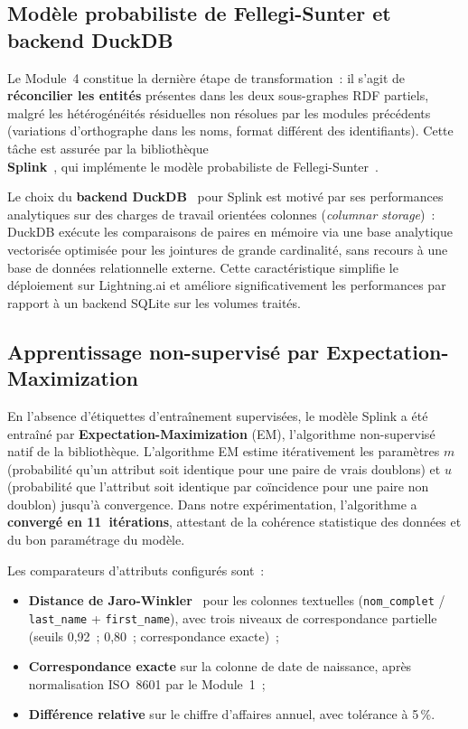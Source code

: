\subsection{Modèle probabiliste de Fellegi-Sunter et backend DuckDB}
\label{subsec:splink_fellegi}

Le Module~4 constitue la dernière étape de transformation~: il s'agit
de \textbf{réconcilier les entités} présentes dans les deux sous-graphes
RDF partiels, malgré les hétérogénéités résiduelles non résolues par
les modules précédents (variations d'orthographe dans les noms, format
différent des identifiants). Cette tâche est assurée par la bibliothèque\\
\textbf{Splink}~\cite{splink2023}, qui implémente le modèle
probabiliste de Fellegi-Sunter~\cite{fellegi1969theory}.

Le choix du \textbf{backend DuckDB}~\cite{duckdb2019} pour Splink est
motivé par ses performances analytiques sur des charges de travail
orientées colonnes (\textit{columnar storage})~: DuckDB exécute les
comparaisons de paires en mémoire via une base analytique vectorisée
optimisée pour les jointures de grande cardinalité, sans recours à une
base de données relationnelle externe. Cette caractéristique simplifie
le déploiement sur Lightning.ai et améliore significativement les
performances par rapport à un backend SQLite sur les volumes traités.

\subsection{Apprentissage non-supervisé par Expectation-Maximization}
\label{subsec:em_training}

En l'absence d'étiquettes d'entraînement supervisées, le modèle Splink
a été entraîné par \textbf{Expectation-Maximization} (EM), l'algorithme
non-supervisé natif de la bibliothèque. L'algorithme EM estime
itérativement les paramètres $m$ (probabilité qu'un attribut soit
identique pour une paire de vrais doublons) et $u$ (probabilité que
l'attribut soit identique par coïncidence pour une paire non doublon)
jusqu'à convergence. Dans notre expérimentation, l'algorithme a
\textbf{convergé en 11~itérations}, attestant de la cohérence
statistique des données et du bon paramétrage du modèle.

Les comparateurs d'attributs configurés sont~:

\begin{itemize}
  \item \textbf{Distance de Jaro-Winkler}~\cite{winkler1990string}
    pour les colonnes textuelles (\texttt{nom\_complet} /
    \texttt{last\_name} + \texttt{first\_name}), avec trois niveaux
    de correspondance partielle (seuils 0,92~; 0,80~; correspondance
    exacte)~;
  \item \textbf{Correspondance exacte} sur la colonne de date de
    naissance, après normalisation ISO~8601 par le Module~1~;
  \item \textbf{Différence relative} sur le chiffre d'affaires annuel,
    avec tolérance à 5\,\%.
\end{itemize}

